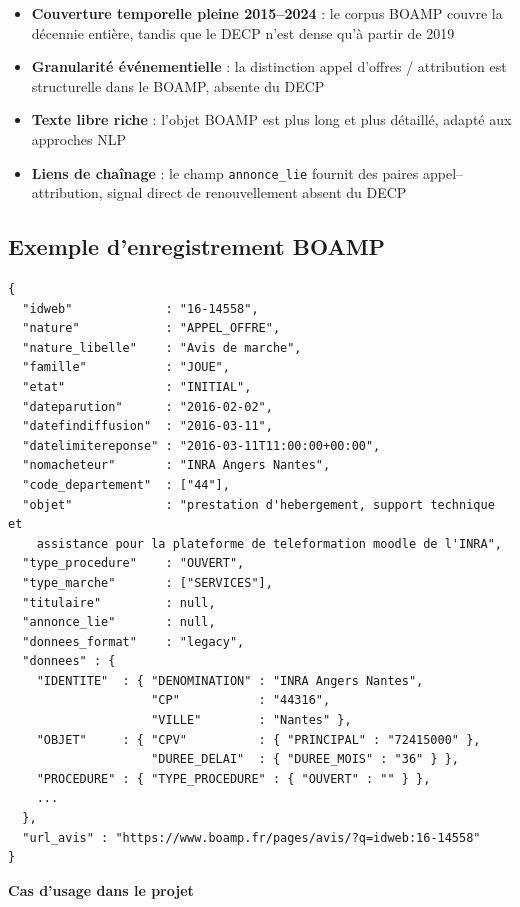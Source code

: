 \documentclass[12pt,a4paper]{article}
\begin{document}
\begin{itemize}
  \item[---] \textbf{Couverture temporelle pleine 2015--2024} : le corpus
    BOAMP couvre la décennie entière, tandis que le DECP n'est dense qu'à
    partir de 2019
  \item[---] \textbf{Granularité événementielle} : la distinction appel
    d'offres / attribution est structurelle dans le BOAMP, absente du DECP
  \item[---] \textbf{Texte libre riche} : l'objet BOAMP est plus long et
    plus détaillé, adapté aux approches NLP
  \item[---] \textbf{Liens de chaînage} : le champ \texttt{annonce\_lie}
    fournit des paires appel--attribution, signal direct de renouvellement
    absent du DECP
\end{itemize}

\subsection{Exemple d'enregistrement BOAMP}

\begin{lstlisting}[language={}]
{
  "idweb"             : "16-14558",
  "nature"            : "APPEL_OFFRE",
  "nature_libelle"    : "Avis de marche",
  "famille"           : "JOUE",
  "etat"              : "INITIAL",
  "dateparution"      : "2016-02-02",
  "datefindiffusion"  : "2016-03-11",
  "datelimitereponse" : "2016-03-11T11:00:00+00:00",
  "nomacheteur"       : "INRA Angers Nantes",
  "code_departement"  : ["44"],
  "objet"             : "prestation d'hebergement, support technique et
    assistance pour la plateforme de teleformation moodle de l'INRA",
  "type_procedure"    : "OUVERT",
  "type_marche"       : ["SERVICES"],
  "titulaire"         : null,
  "annonce_lie"       : null,
  "donnees_format"    : "legacy",
  "donnees" : {
    "IDENTITE"  : { "DENOMINATION" : "INRA Angers Nantes",
                    "CP"           : "44316",
                    "VILLE"        : "Nantes" },
    "OBJET"     : { "CPV"          : { "PRINCIPAL" : "72415000" },
                    "DUREE_DELAI"  : { "DUREE_MOIS" : "36" } },
    "PROCEDURE" : { "TYPE_PROCEDURE" : { "OUVERT" : "" } },
    ...
  },
  "url_avis" : "https://www.boamp.fr/pages/avis/?q=idweb:16-14558"
}
\end{lstlisting}

\medskip
\textbf{Cas d'usage dans le projet}
\end{document}
